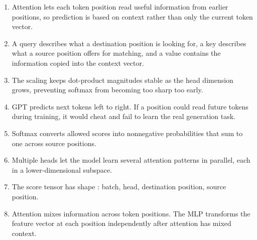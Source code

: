 \begin{enumerate}
  \item Attention lets each token position read useful information from earlier positions, so prediction is based on context rather than only the current token vector.
  \item A query describes what a destination position is looking for, a key describes what a source position offers for matching, and a value contains the information copied into the context vector.
  \item The scaling keeps dot-product magnitudes stable as the head dimension grows, preventing softmax from becoming too sharp too early.
  \item GPT predicts next tokens left to right. If a position could read future tokens during training, it would cheat and fail to learn the real generation task.
  \item Softmax converts allowed scores into nonnegative probabilities that sum to one across source positions.
  \item Multiple heads let the model learn several attention patterns in parallel, each in a lower-dimensional subspace.
  \item The score tensor has shape \shape{[2,3,4,4]}: batch, head, destination position, source position.
  \item Attention mixes information across token positions. The MLP transforms the feature vector at each position independently after attention has mixed context.
\end{enumerate}
